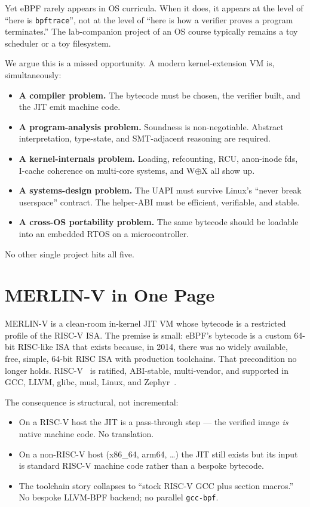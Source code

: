 \documentclass[11pt,a4paper]{article}
\begin{document}
Yet eBPF rarely appears in OS curricula.  When it does, it
appears at the level of ``here is \texttt{bpftrace}'', not at the
level of ``here is how a verifier proves a program terminates.''
The lab-companion project of an OS course typically remains a
toy scheduler or a toy filesystem.

We argue this is a missed opportunity.  A modern kernel-extension
VM is, simultaneously:
\begin{itemize}[leftmargin=*]
  \item \textbf{A compiler problem.}  The bytecode must be
    chosen, the verifier built, and the JIT emit machine code.
  \item \textbf{A program-analysis problem.}  Soundness is
    non-negotiable.  Abstract interpretation, type-state, and
    SMT-adjacent reasoning are required.
  \item \textbf{A kernel-internals problem.}  Loading,
    refcounting, RCU, anon-inode fds, I-cache coherence on
    multi-core systems, and W$\oplus$X all show up.
  \item \textbf{A systems-design problem.}  The UAPI must
    survive Linux's ``never break userspace'' contract.  The
    helper-ABI must be efficient, verifiable, and stable.
  \item \textbf{A cross-OS portability problem.}  The same
    bytecode should be loadable into an embedded RTOS on a
    microcontroller.
\end{itemize}

No other single project hits all five.

\section{MERLIN-V in One Page}
\label{sec:merlin}

MERLIN-V is a clean-room in-kernel JIT VM whose bytecode is a
restricted profile of the RISC-V ISA.  The premise is small:
eBPF's bytecode is a custom 64-bit RISC-like ISA that exists
because, in 2014, there was no widely available, free, simple,
64-bit RISC ISA with production toolchains.  That precondition
no longer holds.  RISC-V~\cite{riscv-isa-manual} is ratified,
ABI-stable, multi-vendor, and supported in GCC, LLVM, glibc,
musl, Linux, and Zephyr~\cite{zephyr-rtos}.

The consequence is structural, not incremental:
\begin{itemize}[leftmargin=*]
  \item On a RISC-V host the JIT is a pass-through step --- the
    verified image \emph{is} native machine code.  No
    translation.
  \item On a non-RISC-V host (x86\_64, arm64, \ldots) the JIT
    still exists but its input is standard RISC-V machine code
    rather than a bespoke bytecode.
  \item The toolchain story collapses to ``stock RISC-V GCC
    plus section macros.''  No bespoke LLVM-BPF backend; no
    parallel \texttt{gcc-bpf}.
\end{itemize}
\end{document}
